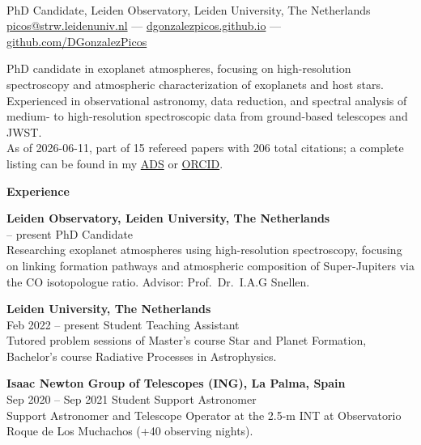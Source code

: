 \documentclass[10pt,letterpaper]{article}
\newcommand{\sectionheader}[1]{\vspace{0.55em}\noindent\textbf{#1}\vspace{0.15em}\par}
\begin{document}
\thispagestyle{empty}

\\[0.15em]
\noindent PhD Candidate, Leiden Observatory, Leiden University, The Netherlands\\
\noindent \href{mailto:picos@strw.leidenuniv.nl}{picos@strw.leidenuniv.nl} ---
\href{https://dgonzalezpicos.github.io}{dgonzalezpicos.github.io} ---
\href{https://github.com/DGonzalezPicos}{github.com/DGonzalezPicos}

\vspace{0.6em}
\noindent PhD candidate in exoplanet atmospheres, focusing on high-resolution spectroscopy and atmospheric characterization of exoplanets and host stars.\\
Experienced in observational astronomy, data reduction, and spectral analysis of medium- to high-resolution spectroscopic data from ground-based telescopes and JWST.\\
As of 2026-06-11, part of 15 refereed papers with 206 total citations; a complete listing can be found in my \href{https://ui.adsabs.harvard.edu/search/p_=0&q=author%3A%22Gonz%C3%A1lez%20Picos%2C%20D.%3B%20Picos%2C%20Dar%C3%ADo%20Gonz%C3%A1lez%22&sort=date%20desc%2C%20bibcode%20desc}{ADS} or \href{https://orcid.org/0000-0001-9282-9462}{ORCID}.

\sectionheader{Experience}
\noindent\textbf{Leiden Observatory, Leiden University, The Netherlands}\\
 -- present \hspace{1.5em} PhD Candidate\\
Researching exoplanet atmospheres using high-resolution spectroscopy, focusing on linking formation pathways and atmospheric composition of Super-Jupiters via the CO isotopologue ratio. Advisor: Prof.\ Dr.\ I.A.G Snellen.

\vspace{0.35em}
\noindent\textbf{Leiden University, The Netherlands}\\
\noindent Feb 2022 -- present \hspace{0.5em} Student Teaching Assistant\\
Tutored problem sessions of Master's course Star and Planet Formation, Bachelor's course Radiative Processes in Astrophysics.

\vspace{0.35em}
\noindent\textbf{Isaac Newton Group of Telescopes (ING), La Palma, Spain}\\
\noindent Sep 2020 -- Sep 2021 \hspace{0.5em} Student Support Astronomer\\
Support Astronomer and Telescope Operator at the 2.5-m INT at Observatorio Roque de Los Muchachos (+40 observing nights).
\end{document}

